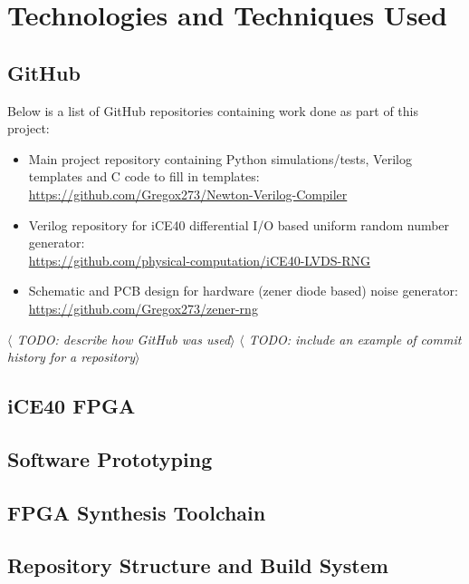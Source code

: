 \documentclass[12pt]{article}
\begin{document}
\newpage



%
%

\section{Technologies and Techniques Used}
  \subsection{GitHub} \label{subsection:GitHub}
    Below is a list of GitHub repositories containing work done as part of this project:
    \begin{itemize}
        \item Main project repository containing Python simulations/tests, Verilog templates and C code to fill in templates:\\
        \url{https://github.com/Gregox273/Newton-Verilog-Compiler}
        \item Verilog repository for iCE40 differential I/O based uniform random number generator:\\
        \url{https://github.com/physical-computation/iCE40-LVDS-RNG}
        \item Schematic and PCB design for hardware (zener diode based) noise generator:\\
        \url{https://github.com/Gregox273/zener-rng}

    \end{itemize}
    \textit{$\langle$ TODO: describe how GitHub was used$\rangle$}
    \textit{$\langle$ TODO: include an example of commit history for a repository$\rangle$}

  \subsection{iCE40 FPGA}

  \subsection{Software Prototyping}

  \subsection{FPGA Synthesis Toolchain}

  \subsection{Repository Structure and Build System}
\end{document}
